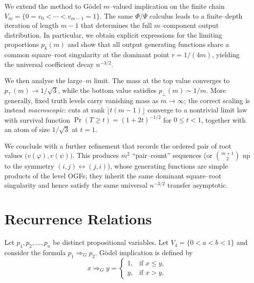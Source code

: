 \documentclass[11pt]{article}
\newcommand{\ptop}{p_{\top}}
\newcommand{\pbot}{p_{\bot}}
\begin{document}
We extend the method to Gödel $m$--valued implication on the finite chain
$V_m=\{0=v_0<\cdots<v_{m-1}=1\}$.  The same $\Phi/\Psi$ calculus leads to a finite--depth
iteration of length $m-1$ that determines the full $m$--component output distribution.
In particular, we obtain explicit expressions for the limiting proportions $p_k(m)$ and show
that all output generating functions share a common square--root singularity at the dominant
point $r=1/(4m)$, yielding the universal coefficient decay $n^{-3/2}$.

We then analyse the large--$m$ limit.  The mass at the top value converges to
$\ptop(m)\to 1/\sqrt3$, while the bottom value satisfies $\pbot(m)\sim 1/m$.
More generally, fixed truth levels carry vanishing mass as $m\to\infty$; the correct scaling
is instead \emph{macroscopic}: cuts at rank $\lfloor t(m-1)\rfloor$ converge to a nontrivial
limit law with survival function $\Pr(T\ge t)=(1+2t)^{-1/2}$ for $0\le t<1$, together with an
atom of size $1/\sqrt3$ at $t=1$.

We conclude with a further refinement that records the ordered pair of root values
$\bigl(v(\varphi),v(\psi)\bigr)$.  This produces $m^2$ ``pair--count'' sequences (or
$\binom{m+1}{2}$ up to the symmetry $(i,j)\leftrightarrow(j,i)$), whose generating functions
are simple products of the level OGFs; they inherit the same dominant square--root singularity
and hence satisfy the same universal $n^{-3/2}$ transfer asymptotic.



\makeatletter
{}
\makeatother

\renewcommand{\thesection}{\Roman{part}.\arabic{section}}
\renewcommand{\thesubsection}{\thesection.\arabic{subsection}}


\newpage


\section{Recurrence Relations}
Let $p_1, p_2, \ldots ,p_n$ be distinct propositional variables.
Let \(V_4=\{0<a<b<1\}\) and consider the formula \(p_1 \Rightarrow_G p_2\).
Gödel implication is defined by
\[
x \Rightarrow_G y =
\begin{cases}
1, & \text{if } x \le y,\\
y, & \text{if } x > y .
\end{cases}
\]
\end{document}
